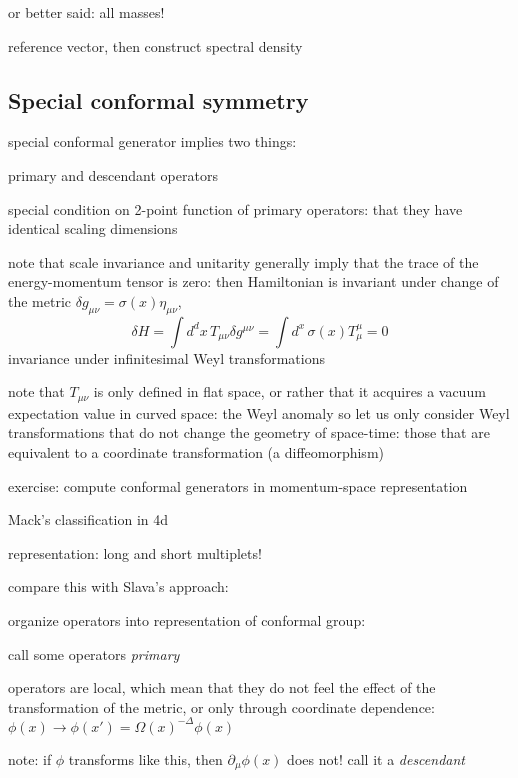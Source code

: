 \documentclass[a4paper,12pt]{article}
\numberwithin{equation}{section}
\begin{document}
or better said: all masses!

reference vector, then construct spectral density


\subsection{Special conformal symmetry}

special conformal generator implies two things:

primary and descendant operators

special condition on 2-point function of primary operators: that they have identical scaling dimensions



note that scale invariance and unitarity generally imply that the trace of the energy-momentum tensor is zero: then Hamiltonian is invariant under change of the metric $\delta g_{\mu\nu} = \sigma(x) \eta_{\mu\nu}$,
\begin{equation}
	\delta H = \int d^dx \, T_{\mu\nu} \delta g^{\mu\nu}
	= \int d^x \, \sigma(x) T^\mu_\mu = 0
\end{equation}
invariance under infinitesimal Weyl transformations 

note that $T_{\mu\nu}$ is only defined in flat space, or rather that it acquires a vacuum expectation value in curved space: the Weyl anomaly
so let us only consider Weyl transformations that do not change the geometry of space-time: those that are equivalent to a coordinate transformation (a diffeomorphism)


exercise: compute conformal generators in momentum-space representation


Mack's classification in 4d


representation: long and short multiplets!




compare this with Slava's approach:

organize operators into representation of conformal group:

call some operators \emph{primary}

operators are local, which mean that they do not feel the effect of the transformation of the metric, or only through coordinate dependence:
$\phi(x) \to \phi(x') = \Omega(x)^{-\Delta} \phi(x)$

note: if $\phi$ transforms like this, then $\partial_\mu \phi(x)$ does not! call it a \emph{descendant}
\end{document}
